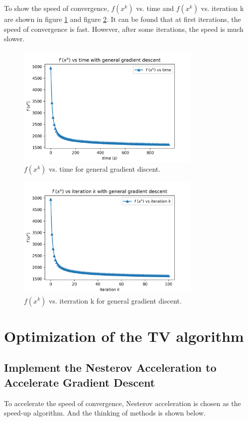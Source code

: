 \documentclass{article}
\begin{document}
To show the speed of convergence, $f(x^{k})$ vs. time and  $f(x^{k})$ vs. iteration k are shown in figure \ref{img8} and figure \ref{img9}. It can be found that at first iterations, the speed of convergence is fast. However, after some iterations, the speed is much slower.

\begin{figure}[h]
  \includegraphics[width=3.5in]{pic8.png}
  \centering
  \caption{$f(x^{k})$ vs. time for general gradient discent.}
  \label{img8}
\end{figure}

\begin{figure}[h]
  \includegraphics[width=3.5in]{pic9.png}
  \centering
  \caption{$f(x^{k})$ vs. iterration k for general gradient discent.}
  \label{img9}
\end{figure}

\section{Optimization of the TV algorithm}


\subsection{Implement the Nesterov Acceleration to Accelerate Gradient Descent}

To accelerate the speed of convergence, Nesterov acceleration is chosen as the speed-up algorithm. And the thinking of methods is shown below.
\end{document}
